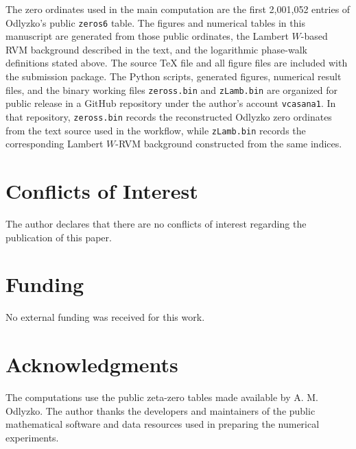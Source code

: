 \documentclass[12pt]{article}
\numberwithin{equation}{section}
\begin{document}
The zero ordinates used in the main computation are the first 2,001,052 entries of Odlyzko's public \texttt{zeros6} table.  The figures and numerical tables in this manuscript are generated from those public ordinates, the Lambert \(W\)-based RVM background described in the text, and the logarithmic phase-walk definitions stated above.  The source \TeX{} file and all figure files are included with the submission package.  The Python scripts, generated figures, numerical result files, and the binary working files \texttt{zeross.bin} and \texttt{zLamb.bin} are organized for public release in a GitHub repository under the author's account \texttt{vcasana1}.  In that repository, \texttt{zeross.bin} records the reconstructed Odlyzko zero ordinates from the text source used in the workflow, while \texttt{zLamb.bin} records the corresponding Lambert \(W\)-RVM background constructed from the same indices.

\section*{Conflicts of Interest}
\label{sec:conflicts_of_interest}

The author declares that there are no conflicts of interest regarding the publication of this paper.

\section*{Funding}
\label{sec:funding}

No external funding was received for this work.

\section*{Acknowledgments}
\label{sec:acknowledgments}

The computations use the public zeta-zero tables made available by A. M. Odlyzko.  The author thanks the developers and maintainers of the public mathematical software and data resources used in preparing the numerical experiments.
\end{document}
